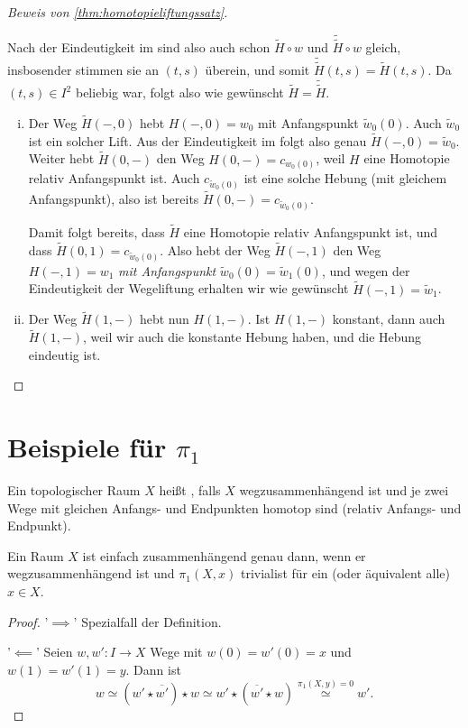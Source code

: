 \begin{proof}[Beweis von \autoref{thm:homotopieliftungssatz}]
\begin{description}
    Nach der Eindeutigkeit im  sind also auch schon $\tilde{H} \circ w$ und $\tilde{\tilde{H}} \circ w$ gleich, insbosender stimmen sie an $(t,s)$ überein, und somit  $\tilde{\tilde{H}}(t,s) = \tilde{H}(t,s) $. Da $(t,s)\in I^2$ beliebig war, folgt also wie gewünscht $\tilde{H} = \tilde{\tilde{H}} $.
\end{description}
\begin{enumerate}[i)]
\item Der Weg $\tilde{H}(-,0)$ hebt $H(-,0)= w_0$ mit Anfangspunkt $\tilde{w}_0(0)$. Auch $\tilde{w}_0$ ist ein solcher Lift. Aus der Eindeutigkeit im  folgt also genau $\tilde{H}(-,0) = \tilde{w}_0$.
    Weiter hebt $\tilde{H}(0,-)$ den Weg $H(0,-) = c_{w_0(0)}$, weil $H$ eine Homotopie relativ Anfangspunkt ist. Auch  $c_{\tilde{w}_0(0)}$ ist eine solche Hebung (mit gleichem Anfangspunkt), also ist bereits $\tilde{H}(0,-) = c_{\tilde{w}_0(0)}$.

    Damit folgt bereits, dass $\tilde{H}$ eine Homotopie relativ Anfangspunkt ist, und dass $\tilde{H}(0,1) = c_{\tilde{w}_0(0)}$. Also hebt der Weg $\tilde{H}(-,1)$ den Weg $H(-,1) = w_1$ \textit{mit Anfangspunkt} $\tilde{w}_0(0) = \tilde{w}_1(0)$, und wegen der Eindeutigkeit der Wegeliftung erhalten wir wie gewünscht $\tilde{H}(-,1) = \tilde{w}_1$.
\item Der Weg $\tilde{H}(1,-)$ hebt nun $H(1,-)$. Ist  $H(1,-)$ konstant, dann auch  $\tilde{H}(1,-)$, weil wir auch die konstante Hebung haben, und die Hebung eindeutig ist.
\end{enumerate}
\end{proof}

\section{Beispiele für $\pi_1$}

\begin{definition}
    Ein topologischer Raum $X$ heißt  , falls $X$ wegzusammenhängend ist und je zwei Wege mit gleichen Anfangs- und Endpunkten homotop sind (relativ Anfangs- und Endpunkt).
\end{definition}

\begin{lemma}
    Ein Raum $X$ ist einfach zusammenhängend genau dann, wenn er wegzusammenhängend ist und  $\pi_1(X,x)$ trivialist für ein (oder äquivalent alle) $x\in X$.
\end{lemma}

\begin{proof}
'$\implies$' Spezialfall der Definition.    

'$\impliedby$' Seien $w, w'\colon I \to X$ Wege mit $w(0) = w'(0) =x$ und  $w(1) = w'(1) = y$. Dann ist 
 \[
     w \simeq (w' \star  \overline{w'}) \star w \simeq w' \star (\overline{w'} \star w) \stackrel{\pi_1(X,y) = 0}{\simeq} w'
.\] 
\end{proof}

